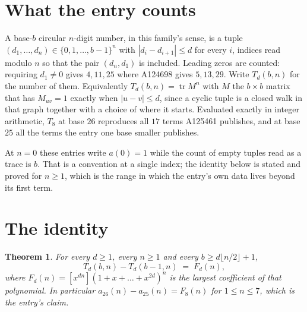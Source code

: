 \documentclass[11pt,a4paper]{article}
\theoremstyle{plain}
\newtheorem{theorem}{Theorem}
\theoremstyle{definition}
\begin{document}
\section{What the entry counts}

A base-$b$ circular $n$-digit number, in this family's sense, is a tuple
$(d_1,\dots,d_n)\in\{0,1,\dots,b-1\}^{n}$ with $|d_i-d_{i+1}|\le d$ for every $i$, indices
read modulo $n$ so that the pair $(d_n,d_1)$ is included. Leading zeros are counted: requiring
$d_1\ne0$ gives $4,11,25$ where A124698 gives $5,13,29$. Write $T_d(b,n)$ for the number of
them. Equivalently $T_d(b,n)=\operatorname{tr}M^{n}$ with $M$ the $b\times b$ matrix that has
$M_{uv}=1$ exactly when $|u-v|\le d$, since a cyclic tuple is a closed walk in that graph
together with a choice of where it starts. Evaluated exactly in integer arithmetic, $T_{8}$
at base $26$ reproduces all $17$ terms A125461 publishes, and at base $25$ all the
terms the entry one base smaller publishes.

At $n=0$ these entries write $a(0)=1$ while the count of empty tuples read as a trace is $b$.
That is a convention at a single index; the identity below is stated and proved for $n\ge1$,
which is the range in which the entry's own data lives beyond its first term.

\section{The identity}

\begin{theorem}
For every $d\ge1$, every $n\ge1$ and every $b\ge d\lfloor n/2\rfloor+1$,
\[
T_d(b,n)-T_d(b-1,n)\;=\;F_d(n),
\]
where $F_d(n)=[x^{dn}](1+x+\dots+x^{2d})^{n}$ is the largest coefficient of that
polynomial. In particular $a_{26}(n)-a_{25}(n)=F_{8}(n)$ for $1\le n\le7$, which
is the entry's claim.
\end{theorem}
\end{document}

